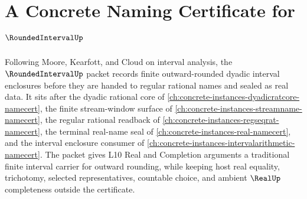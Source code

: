 \chapter{A Concrete Naming Certificate for $\RoundedIntervalUp$}
\label{ch:concrete-instances-rounded-interval-namecert}

Following Moore, Kearfott, and Cloud on interval analysis, the $\RoundedIntervalUp$ packet records finite outward-rounded dyadic interval enclosures before they are handed to regular rational names and sealed as real data. It sits after the dyadic rational core of \autoref{ch:concrete-instances-dyadicratcore-namecert}, the finite stream-window surface of \autoref{ch:concrete-instances-streamname-namecert}, the regular rational readback of \autoref{ch:concrete-instances-regseqrat-namecert}, the terminal real-name seal of \autoref{ch:concrete-instances-real-namecert}, and the interval enclosure consumer of \autoref{ch:concrete-instances-intervalarithmetic-namecert}. The packet gives L10 Real and Completion arguments a traditional finite interval carrier for outward rounding, while keeping host real equality, trichotomy, selected representatives, countable choice, and ambient $\RealUp$ completeness outside the certificate.

